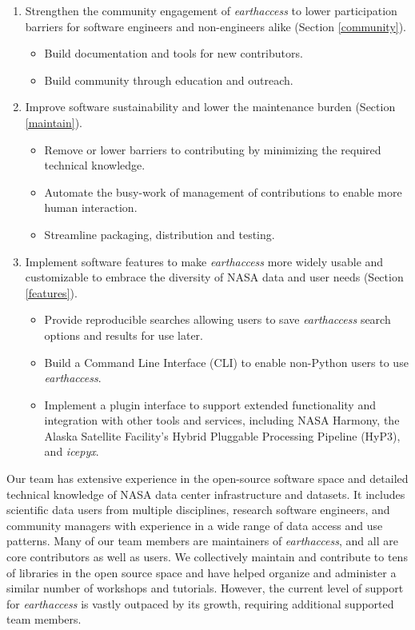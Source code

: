 \documentclass{ROSES-NASA-proposal}
\newcommand{\earthaccess}{\textit{earthaccess}\xspace} %
\begin{document}
\begin{enumerate}
    \item Strengthen the community engagement of \earthaccess to lower participation barriers for software engineers and non-engineers alike (Section \ref{community}).

    \begin{itemize}[itemsep=-.1em]
        \item Build documentation and tools for new contributors.
        \item Build community through education and outreach.
    \end{itemize}
    
    \item Improve software sustainability and lower the maintenance burden (Section \ref{maintain}).

    \begin{itemize}[itemsep=-.1em]
        \item Remove or lower barriers to contributing by minimizing the required technical knowledge.
        \item Automate the busy-work of management of contributions to enable more human interaction.
        \item Streamline packaging, distribution and testing.
    \end{itemize}
    
    \item Implement software features to make \earthaccess more widely usable and customizable to embrace the diversity of NASA data and user needs (Section \ref{features}).

    \begin{itemize}[itemsep=-.1em]
        \item Provide reproducible searches allowing users to save \earthaccess search options and results for use later.
        \item Build a Command Line Interface (CLI) to enable non-Python users to use \earthaccess.
        \item Implement a plugin interface to support extended functionality and integration with other tools and services, including NASA Harmony, the Alaska Satellite Facility's Hybrid Pluggable Processing Pipeline (HyP3), and \textit{icepyx}.
    \end{itemize}

\end{enumerate}


Our team has extensive experience in the open-source software space and detailed technical knowledge of NASA data center infrastructure and datasets. It includes scientific data users from multiple disciplines, research software engineers, and community managers with experience in a wide range of data access and use patterns. Many of our team members are maintainers of \earthaccess, and all are core contributors as well as users. We collectively maintain and contribute to tens of libraries in the open source space and have helped organize and administer a similar number of workshops and tutorials. However, the current level of support for \earthaccess is vastly outpaced by its growth, requiring additional supported team members.
\end{document}

